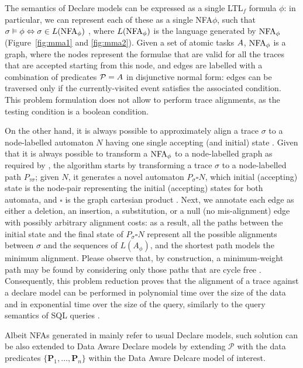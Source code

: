 The semantics of Declare models can be expressed as a single LTL$_f$ formula $\phi$: in particular, we can represent each of these  as a single NFA$\phi$, such that $\sigma\vDash\phi\Leftrightarrow \sigma\in L(\textup{NFA}_\phi)$ \cite{GiacomoV13,GiacomoMM14}, where $L(\textup{NFA}_\phi)$ is the language generated by $\textup{NFA}_\phi$ (Figure~\ref{fig:mma1} and \ref{fig:mma2}). Given a set of atomic tasks $A$, $\textup{NFA}_\phi$ is a graph, where  the nodes represent the formulae that are valid for all the traces that are accepted starting from this node, and  edges are labelled with  a combination of predicates $\mathcal{P}=A$ in disjunctive normal form: edges can be traversed only if the currently-visited event satisfies the associated condition. This problem formulation does not allow to perform trace alignments, as the testing condition is a boolean condition. 


On the other hand, it is always possible to approximately align a trace $\sigma$ to a node-labelled automaton $N$ having one single accepting (and initial) state \cite{Myers1989}. Given that it is always possible to transform a $\textup{NFA}_\phi$ to a node-labelled graph \cite{CAiSE21} as required by \cite{Myers1989}, the algorithm starts by transforming a trace $\sigma$ to a node-labelled path $P_{\tau\sigma}$; given $N$, it generates a novel automaton $P_\sigma\square N$, which initial (accepting) state is the node-pair representing the initial (accepting) states for both automata, and $\square$ is the graph cartesian product \cite{10.5555/2031398}. Next, we annotate each edge as either a deletion, an insertion, a substitution, or a null (no mis-alignment) edge with possibly arbitrary alignment costs: as a result, all the paths between the initial state and the final state of $P_\sigma\square N$ represent all the possible alignments between $\sigma$ and the sequences of $L(A_\phi)$, and the shortest path models the minimum alignment. Please observe that, by construction, a minimum-weight path may be found by considering only those paths that are cycle free \cite{10.5555/2031398}. Consequently, this problem reduction proves that the alignment of a trace against a declare model can be performed in polynomial time over the size of the data and in exponential time over the size of the query, similarly to the query semantics of SQL queries \cite{DBLP:conf/stoc/Vardi82}.

Albeit NFAs generated in \cite{GiacomoV13,GiacomoMM14} mainly refer to usual Declare models, such solution can be also extended to Data Aware Declare models by extending $\mathcal{P}$ with the data predicates $\{\mathbf{P}_1,\dots,\mathbf{P}_n\}$ within the Data Aware Delcare model of interest.

